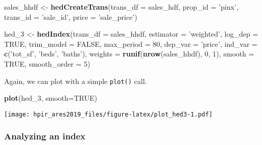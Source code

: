 \documentclass[]{article}
\newenvironment{Shaded}{\begin{snugshade}}{\end{snugshade}}
\newcommand{\DataTypeTok}[1]{\textcolor[rgb]{0.13,0.29,0.53}{#1}}
\newcommand{\DecValTok}[1]{\textcolor[rgb]{0.00,0.00,0.81}{#1}}
\newcommand{\KeywordTok}[1]{\textcolor[rgb]{0.13,0.29,0.53}{\textbf{#1}}}
\newcommand{\NormalTok}[1]{#1}
\newcommand{\OtherTok}[1]{\textcolor[rgb]{0.56,0.35,0.01}{#1}}
\newcommand{\StringTok}[1]{\textcolor[rgb]{0.31,0.60,0.02}{#1}}
\begin{document}
\begin{Shaded}
\begin{Highlighting}[]
\NormalTok{  sales_hhdf <-}\StringTok{ }\KeywordTok{hedCreateTrans}\NormalTok{(}\DataTypeTok{trans_df =}\NormalTok{ sales_hdf,}
                               \DataTypeTok{prop_id =} \StringTok{'pinx'}\NormalTok{,}
                               \DataTypeTok{trans_id =} \StringTok{'sale_id'}\NormalTok{,}
                               \DataTypeTok{price =} \StringTok{'sale_price'}\NormalTok{)}
\end{Highlighting}
\end{Shaded}

\begin{Shaded}
\begin{Highlighting}[]
\NormalTok{  hed_}\DecValTok{3}\NormalTok{ <-}\StringTok{ }\KeywordTok{hedIndex}\NormalTok{(}\DataTypeTok{trans_df =}\NormalTok{ sales_hhdf,}
                    \DataTypeTok{estimator =} \StringTok{'weighted'}\NormalTok{,}
                    \DataTypeTok{log_dep =} \OtherTok{TRUE}\NormalTok{,}
                    \DataTypeTok{trim_model =} \OtherTok{FALSE}\NormalTok{,}
                    \DataTypeTok{max_period =} \DecValTok{80}\NormalTok{,}
                    \DataTypeTok{dep_var =} \StringTok{'price'}\NormalTok{,}
                    \DataTypeTok{ind_var =} \KeywordTok{c}\NormalTok{(}\StringTok{'tot_sf'}\NormalTok{, }\StringTok{'beds'}\NormalTok{, }\StringTok{'baths'}\NormalTok{),}
                    \DataTypeTok{weights =} \KeywordTok{runif}\NormalTok{(}\KeywordTok{nrow}\NormalTok{(sales_hhdf), }\DecValTok{0}\NormalTok{, }\DecValTok{1}\NormalTok{),}
                    \DataTypeTok{smooth =} \OtherTok{TRUE}\NormalTok{,}
                    \DataTypeTok{smooth_order =} \DecValTok{5}\NormalTok{)}
\end{Highlighting}
\end{Shaded}

Again, we can plot with a simple \texttt{plot()} call.

\begin{Shaded}
\begin{Highlighting}[]
  \KeywordTok{plot}\NormalTok{(hed_}\DecValTok{3}\NormalTok{, }\DataTypeTok{smooth=}\OtherTok{TRUE}\NormalTok{)}
\end{Highlighting}
\end{Shaded}

\texttt{[image: hpir\_ares2019\_files/figure-latex/plot\_hed3-1.pdf]}

\hypertarget{analyzing-an-index}{%
\subsubsection{Analyzing an index}\label{analyzing-an-index}}
\end{document}
